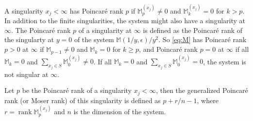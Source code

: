 \documentclass[12pt]{article}
\numberwithin{equation}{section}
\numberwithin{figure}{section}
\newcommand{\M}{\mathds{M}}
\DeclareMathOperator{\rank}{rank}
\begin{document}
      A singularity $x_j<\infty$ has Poincar\'{e} rank $p$ if $\M^{(x_j)}_p \neq 0$ and $\M^{(x_j)}_k = 0$ for $k>p$.
      In addition to the finite singularities, the system might also have a singularity at $\infty$.
      The Poincar\'{e} rank $p$ of a singularity at $\infty$ is defined as the Poincar\'{e} rank of the singularty at $y=0$ of the system $\M(1/y,\epsilon)/y^2$.
      So \eqref{eq:M} has Poincar\'{e} rank $p>0$ at $\infty$ if $\M_{p-1} \neq 0$ and $\M_k = 0$ for $k\geq p$, and Poincar\'{e} rank $p=0$ at $\infty$ if all $\M_k = 0$ and $\sum_{x_j\in S} \M^{(x_j)}_0 \neq 0$.
      If all $\M_k = 0$ and $\sum_{x_j\in S} \M^{(x_j)}_0 = 0$, the system is not singular at $\infty$.

      Let $p$ be the Poincar\'{e} rank of a singularity $x_j<\infty$, then the generalized Poincar\'{e} rank (or Moser rank) \cite{Moser:1959} of this singularity is defined as $p + r/n - 1$, where $r = \rank \M^{(x_j)}_p$ and $n$ is the dimension of the system.
\end{document}

